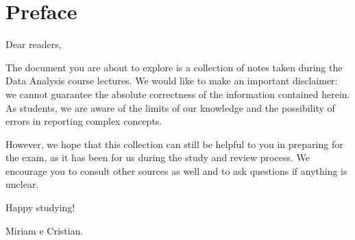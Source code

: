 \chapter*{Preface}
Dear readers,

The document you are about to explore is a collection of notes taken during the Data Analysis course lectures. We would like to make an important disclaimer: we cannot guarantee the absolute correctness of the information contained herein. As students, we are aware of the limits of our knowledge and the possibility of errors in reporting complex concepts.

However, we hope that this collection can still be helpful to you in preparing for the exam, as it has been for us during the study and review process. We encourage you to consult other sources as well and to ask questions if anything is unclear.

Happy studying!

Miriam e Cristian.